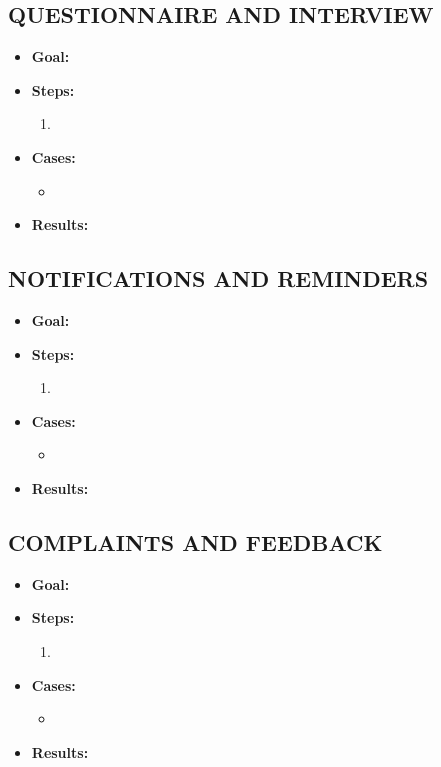 \subsection{QUESTIONNAIRE AND INTERVIEW}\label{subsec:questionnaire-and-interview}
\begin{itemize}
    \item \textbf{Goal:}

    \item \textbf{Steps:}
    \begin{enumerate}
        \item

    \end{enumerate}
    \item \textbf{Cases:}
    \begin{itemize}
        \item
    \end{itemize}
    \item \textbf{Results:}

\end{itemize}

\subsection{NOTIFICATIONS AND REMINDERS}\label{subsec:notifications-and-reminders}
\begin{itemize}
    \item \textbf{Goal:}

    \item \textbf{Steps:}
    \begin{enumerate}
        \item

    \end{enumerate}
    \item \textbf{Cases:}
    \begin{itemize}
        \item
    \end{itemize}
    \item \textbf{Results:}

\end{itemize}

\subsection{COMPLAINTS AND FEEDBACK}\label{subsec:complaints-and-feedback}
\begin{itemize}
    \item \textbf{Goal:}

    \item \textbf{Steps:}
    \begin{enumerate}
        \item

    \end{enumerate}
    \item \textbf{Cases:}
    \begin{itemize}
        \item
    \end{itemize}
    \item \textbf{Results:}

\end{itemize}

